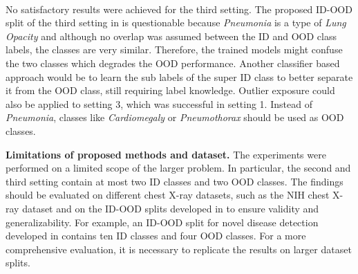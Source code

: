 \\
No satisfactory results were achieved for the third setting.
The proposed ID-OOD split of the third setting in \citep{Berger2021} is questionable because \textit{Pneumonia} is a type of \textit{Lung Opacity} \citep{Hansell2008} and although no overlap was assumed between the ID and OOD class labels, the classes are very similar. 
Therefore, the trained models might confuse the two classes which degrades the OOD performance. 
Another classifier based approach would be to learn the sub labels of the super ID class to better separate it from the OOD class, still requiring label knowledge.
Outlier exposure could also be applied to setting 3, which was successful in setting 1.
Instead of \textit{Pneumonia}, classes like \textit{Cardiomegaly} or \textit{Pneumothorax} should be used as OOD classes.
\par
\textbf{Limitations of proposed methods and dataset.}
The experiments were performed on a limited scope of the larger problem.
In particular, the second and third setting contain at most two ID classes and two OOD classes.
The findings should be evaluated on different chest X-ray datasets, such as the NIH chest X-ray dataset \citep{Wang2017} and on the ID-OOD splits developed in \citep{Cao2020} to ensure validity and generalizability.
For example, an ID-OOD split for novel disease detection developed in \citep{Cao2020} contains ten ID classes and four OOD classes.
For a more comprehensive evaluation, it is necessary to replicate the results on larger dataset splits.
